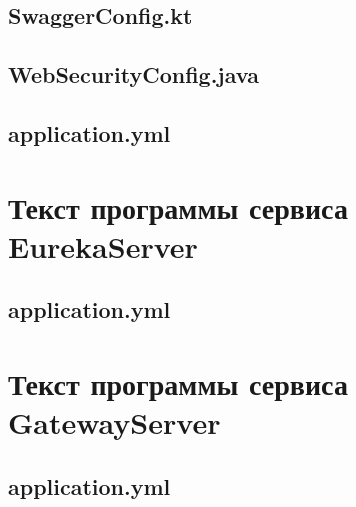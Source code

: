 \documentclass{../includes/TechDoc}
\begin{document}
    \subsection{SwaggerConfig.kt}
    

    \subsection{WebSecurityConfig.java}
    

    \subsection{application.yml}
    

    \section{Текст программы сервиса EurekaServer}

    \subsection{application.yml}
    

    \section{Текст программы сервиса GatewayServer}

    \subsection{application.yml}
    

    \registrationList
\end{document}
